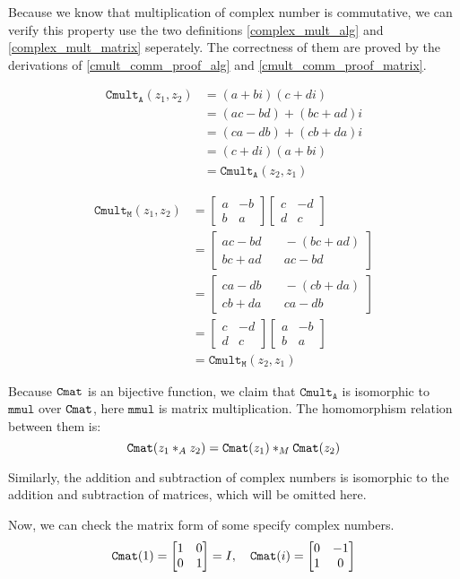 \documentclass[runningheads]{llncs}
\newcommand{\bmatL}{\begin{bmatrix}}
\newcommand{\bmatR}{\end{bmatrix}}
\begin{document}
Because we know that multiplication of complex number is commutative, we can verify this property use the two definitions \eqref{complex_mult_alg} and \eqref{complex_mult_matrix} seperately.
The correctness of them are proved by the derivations of \eqref{cmult_comm_proof_alg} and \eqref{cmult_comm_proof_matrix}.

\begin{equation}\label{cmult_comm_proof_alg}
  \begin{aligned}
    \mathtt{Cmult_A}(z_1,z_2)
    &=(a+bi)(c+di)\\
    &=(ac-bd)+(bc+ad)i\\
    &=(ca-db)+(cb+da)i\\
    &=(c+di)(a+bi)\\
    &=\mathtt{Cmult_A}(z_2,z_1)
  \end{aligned}
\end{equation}

\begin{equation}\label{cmult_comm_proof_matrix}
  \begin{aligned}
    \mathtt{Cmult_M}(z_1,z_2)
    &=\bmatL a&-b\\b&a\bmatR \bmatL c&-d\\d&c\bmatR  \\
    &=\bmatL ac-bd&\quad -(bc+ad)\\bc+ad&\quad ac-bd\bmatR \\
    &=\bmatL ca-db&\quad -(cb+da)\\cb+da&\quad ca-db\bmatR \\
    &=\bmatL c&-d\\d&c\bmatR \bmatL a&-b\\b&a\bmatR  \\
    &=\mathtt{Cmult_M}(z_2,z_1)
  \end{aligned}
\end{equation}

Because $\Cmat$ is an bijective function, we claim that $\mathtt{Cmult_A}$ is isomorphic to $\mathtt{mmul}$ over $\Cmat$,
here $\mathtt{mmul}$ is matrix multiplication.
The homomorphism relation between them is:
\begin{equation}\label{cmula_cmulm_hom}
  \Cmat(z_1 *_A z_2)=\Cmat(z_1) *_M \Cmat(z_2)
\end{equation}

Similarly, the addition and subtraction of complex numbers is isomorphic to the addition and subtraction of matrices, which will be omitted here.

Now, we can check the matrix form of some specify complex numbers.
\begin{equation}
  \Cmat{1}=\bmatL 1&0\\0&1\bmatR =I,\quad
  \Cmat{i}=\bmatL 0&-1\\1&0\bmatR 
\end{equation}
\end{document}

